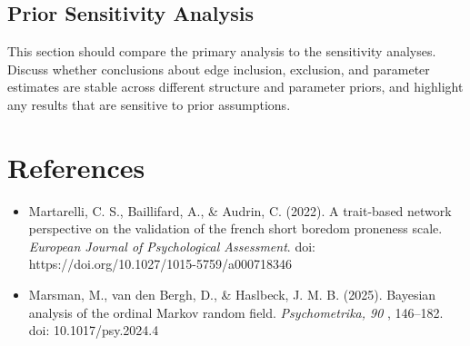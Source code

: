 \documentclass[
  letterpaper,
  DIV=11,
  numbers=noendperiod]{scrartcl}
\begin{document}
\subsection{Prior Sensitivity
Analysis}\label{prior-sensitivity-analysis}

This section should compare the primary analysis to the sensitivity
analyses. Discuss whether conclusions about edge inclusion, exclusion,
and parameter estimates are stable across different structure and
parameter priors, and highlight any results that are sensitive to prior
assumptions.

\section{References}\label{references}

\begin{itemize}
\item
  Martarelli, C. S., Baillifard, A., \& Audrin, C. (2022). A trait-based
  network perspective on the validation of the french short boredom
  proneness scale. \emph{European Journal of Psychological Assessment}.
  doi: https://doi.org/10.1027/1015-5759/a000718346
\item
  Marsman, M., van den Bergh, D., \& Haslbeck, J. M. B. (2025). Bayesian
  analysis of the ordinal Markov random field. \emph{Psychometrika, 90}
  , 146--182. doi: 10.1017/psy.2024.4
\end{itemize}
\end{document}
